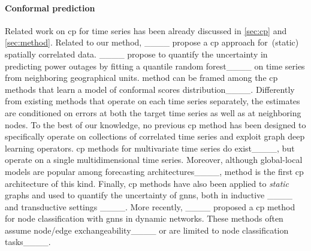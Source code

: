 \paragraph{Conformal prediction} Related work on \gls{cp} for time series  has been already discussed in \autoref{sec:cp} and \autoref{sec:method}. Related to our method, ____ propose a \gls{cp} approach for~(static) spatially correlated data. ____ propose to quantify the uncertainty in predicting power outages by fitting a quantile random forest____ on time series from neighboring geographical units.
\gls{method} can be framed among the \gls{cp} methods that learn a model of conformal scores distribution____. Differently from existing methods that operate on each time series separately, the estimates are conditioned on errors at both the target time series as well as at neighboring nodes.
To the best of our knowledge, no previous \gls{cp} method has been designed to specifically operate on collections of correlated time series and exploit graph deep learning operators. \gls{cp} methods for multivariate time series do exist____, but operate on a single multidimensional time series. Moreover, although global-local models are popular among forecasting architectures____, \gls{method} is the first \gls{cp} architecture of this kind. Finally, \gls{cp} methods have also been applied to \textit{static} graphs and used to quantify the uncertainty of \glspl{gnn}, both in inductive ____ and transductive settings ____. More recently, ____ proposed a \gls{cp} method for node classification with \glspl{gnn} in dynamic networks. These methods often assume node/edge exchangeability____ or are limited to node classification tasks____. 



